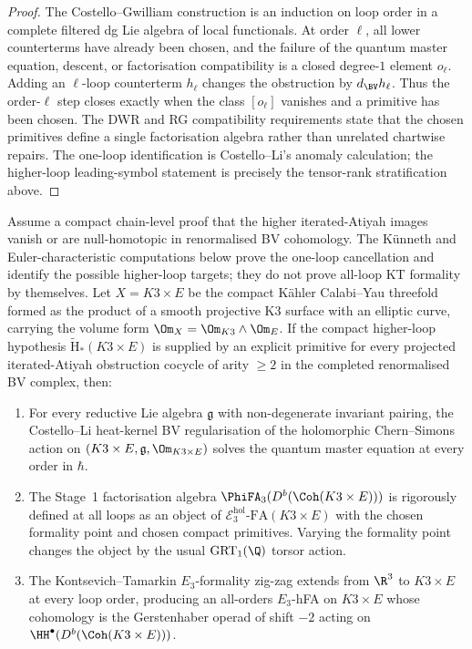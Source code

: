 \begin{proof}
The Costello--Gwilliam construction is an induction on loop order in a
complete filtered dg Lie algebra of local functionals. At order
$\ell$, all lower counterterms have already been chosen, and the
failure of the quantum master equation, descent, or factorisation
compatibility is a closed degree-$1$ element $o_\ell$. Adding an
$\ell$-loop counterterm $h_\ell$ changes the obstruction by
$d_{\BV}h_\ell$. Thus the order-$\ell$ step closes exactly when the
class $[o_\ell]$ vanishes and a primitive has been chosen. The DWR and
RG compatibility requirements state that the chosen primitives define a
single factorisation algebra rather than unrelated chartwise repairs.
The one-loop identification is Costello--Li's anomaly calculation; the
higher-loop leading-symbol statement is precisely the tensor-rank
stratification above.
\end{proof}

\begin{theorem}
\label{thm:cycainf-all-loops-k3e}
Assume a compact chain-level proof that the higher iterated-Atiyah
images vanish or are null-homotopic in
renormalised BV cohomology. The K\"unneth and Euler-characteristic
computations below prove the one-loop cancellation and identify the
possible higher-loop targets; they do not prove all-loop KT formality by
themselves.
Let $X = K3 \times E$ be the compact K\"ahler Calabi--Yau threefold
formed as the product of a smooth projective K3 surface with an
elliptic curve, carrying the volume form $\Om_X = \Om_{K3} \wedge
\Om_E$. If the compact higher-loop hypothesis
$\widetilde{\mathrm H}_*(K3 \times E)$ is supplied by an explicit
primitive for every projected iterated-Atiyah obstruction cocycle of
arity $\geq 2$ in the completed renormalised BV complex, then:
\begin{enumerate}[label=\textup{(\arabic*)}]
\item For every reductive Lie algebra $\mathfrak g$ with non-degenerate
invariant pairing, the Costello--Li heat-kernel BV regularisation of
the holomorphic Chern--Simons action on $(K3 \times E, \mathfrak g,
\Om_{K3 \times E})$ solves the quantum master equation at every order
in $\hbar$.
\item The Stage~1 factorisation algebra $\PhiFA_3(D^b(\Coh(K3 \times
E)))$ is rigorously defined at all loops as an object of
$\mathcal E_3^{\mathrm{hol}}\text{-}\mathrm{FA}(K3 \times E)$ with the
chosen formality point and chosen compact primitives. Varying the
formality point changes the object by the usual $\mathrm{GRT}_1(\Q)$
torsor action.
\item The Kontsevich--Tamarkin $E_3$-formality zig-zag extends from
$\R^3$ to $K3 \times E$ at every loop order, producing an all-orders
$E_3$-hFA on $K3 \times E$ whose cohomology is the Gerstenhaber
operad of shift $-2$ acting on $\HH^\bullet(D^b(\Coh(K3 \times E)))$.
\end{enumerate}
\end{theorem}

